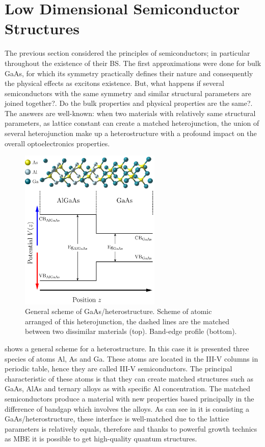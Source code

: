 \section{Low Dimensional Semiconductor Structures}
\label{sec:chapter-1-low-dimensional-structures}
\vspace{-10mm} 
The previous section considered the principles of semiconductors; in particular throughout the existence of their \gls{BS}. The first approximations were done for bulk GaAs, for which its symmetry practically defines their nature and consequently the physical effects as excitons existence.  But, what happens  if several semiconductors with the same symmetry and similar structural parameters are joined together?. Do the bulk properties and physical properties are the same?. 
The answers  are well-known: when two materials with relatively same structural parameters, as lattice constant can create a matched heterojunction, the union of several heterojunction make up a heterostructure with a profound impact on the overall optoelectronics properties.\\
\begin{figure}[ht!]
	\centering
	\includegraphics[width=0.6\textwidth]{../figures/chapter-1/heterostructures/build-ruco/hs-01}
	\caption{General scheme of GaAs/\algaas heterostructure. Scheme of atomic arranged of this heterojunction, the dashed lines are the matched between two dissimilar
	materials (top). Band-edge profile (bottom).}
	\label{fig:subsection-1.2-heterostructure}
\end{figure}
 shows  a general scheme for a heterostructure. In this case it is presented three species of atoms Al, As and Ga. These atoms are located in the III-V columns in periodic table, hence they are called III-V semiconductors. The principal characteristic of these atoms is that they can create matched structures such as GaAs, AlAs and ternary alloys as \algaas with specific Al concentration. The matched semiconductors produce a material with new properties based principally in the difference of bandgap which involves the alloys. 
As can see in  it is consisting a GaAs/\algaas heterostructure, these interface is well-matched due to the lattice parameters is relatively equals, therefore and thanks to powerful growth technics as MBE it is possible to get high-quality quantum structures. 

